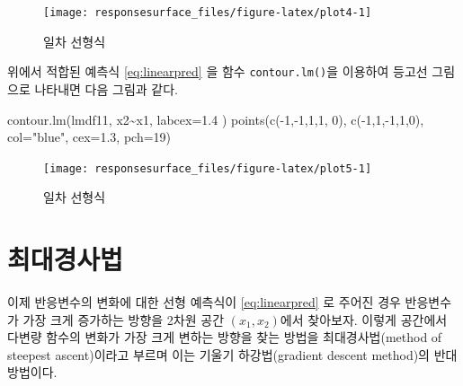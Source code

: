 \documentclass[
]{book}
\newenvironment{Shaded}{\begin{snugshade}}{\end{snugshade}}
\newcommand{\AttributeTok}[1]{\textcolor[rgb]{0.77,0.63,0.00}{#1}}
\newcommand{\DecValTok}[1]{\textcolor[rgb]{0.00,0.00,0.81}{#1}}
\newcommand{\FloatTok}[1]{\textcolor[rgb]{0.00,0.00,0.81}{#1}}
\newcommand{\FunctionTok}[1]{\textcolor[rgb]{0.00,0.00,0.00}{#1}}
\newcommand{\NormalTok}[1]{#1}
\newcommand{\SpecialCharTok}[1]{\textcolor[rgb]{0.00,0.00,0.00}{#1}}
\newcommand{\StringTok}[1]{\textcolor[rgb]{0.31,0.60,0.02}{#1}}
\theoremstyle{definition}
\theoremstyle{definition}
\theoremstyle{definition}
\theoremstyle{definition}
\theoremstyle{remark}
\begin{document}
\begin{figure}

{\centering \texttt{[image: responsesurface\_files/figure-latex/plot4-1]} 

}

\caption{일차 선형식}\label{fig:plot4}
\end{figure}

위에서 적합된 예측식 \eqref{eq:linearpred} 을 함수 \texttt{contour.lm()}을 이용하여 등고선 그림으로 나타내면 다음 그림과 같다.

\begin{Shaded}
\begin{Highlighting}[]
\FunctionTok{contour.lm}\NormalTok{(lmdf11, x2}\SpecialCharTok{\textasciitilde{}}\NormalTok{x1, }\AttributeTok{labcex=}\FloatTok{1.4}\NormalTok{ )}
\FunctionTok{points}\NormalTok{(}\FunctionTok{c}\NormalTok{(}\SpecialCharTok{{-}}\DecValTok{1}\NormalTok{,}\SpecialCharTok{{-}}\DecValTok{1}\NormalTok{,}\DecValTok{1}\NormalTok{,}\DecValTok{1}\NormalTok{, }\DecValTok{0}\NormalTok{), }\FunctionTok{c}\NormalTok{(}\SpecialCharTok{{-}}\DecValTok{1}\NormalTok{,}\DecValTok{1}\NormalTok{,}\SpecialCharTok{{-}}\DecValTok{1}\NormalTok{,}\DecValTok{1}\NormalTok{,}\DecValTok{0}\NormalTok{), }\AttributeTok{col=}\StringTok{"blue"}\NormalTok{, }\AttributeTok{cex=}\FloatTok{1.3}\NormalTok{, }\AttributeTok{pch=}\DecValTok{19}\NormalTok{)}
\end{Highlighting}
\end{Shaded}

\begin{figure}

{\centering \texttt{[image: responsesurface\_files/figure-latex/plot5-1]} 

}

\caption{일차 선형식}\label{fig:plot5}
\end{figure}

\hypertarget{uxcd5cuxb300uxacbduxc0acuxbc95}{%
\section{최대경사법}\label{uxcd5cuxb300uxacbduxc0acuxbc95}}

이제 반응변수의 변화에 대한 선형 예측식이 \eqref{eq:linearpred} 로 주어진 경우 반응변수가 가장 크게 증가하는
방향을 2차원 공간 \((x_1, x_2)\)에서 찾아보자. 이렇게 공간에서 다변량 함수의 변화가 가장 크게 변하는 방향을 찾는 방법을
최대경사법(method of steepest ascent)이라고 부르며 이는 기울기 하강법(gradient descent method)의 반대 방법이다.
\end{document}
